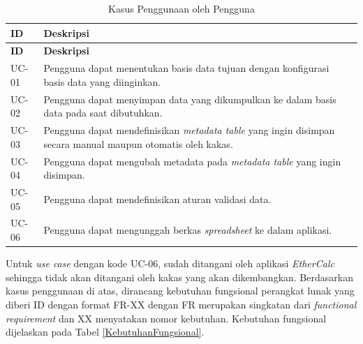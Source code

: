 \begin{small}
	\begin{longtable}{ | p{2cm} | p{10cm} | }
		\caption{Kasus Penggunaan oleh Pengguna}
		\label{KebutuhanPengguna}                                                                                                                     \\ \hline
		\centering\bfseries{ID} & \centering\bfseries{Deskripsi} \tabularnewline \hline
		\endfirsthead
		\hline
		\centering\bfseries{ID} & \centering\bfseries{Deskripsi} \tabularnewline \hline
		\endhead
		UC-01                   & Pengguna dapat menentukan basis data tujuan dengan konfigurasi basis data yang diinginkan.                          \\ \hline
		UC-02                   & Pengguna dapat menyimpan data yang dikumpulkan ke dalam basis data pada saat dibutuhkan.                            \\ \hline
		UC-03                   & Pengguna dapat mendefinisikan \textit{metadata table} yang ingin disimpan secara manual maupun otomatis oleh kakas. \\ \hline
		UC-04                   & Pengguna dapat mengubah metadata pada \textit{metadata table} yang ingin disimpan.                                  \\ \hline
		UC-05                   & Pengguna dapat mendefinisikan aturan validasi data.                                                                 \\ \hline
		UC-06                   & Pengguna dapat mengunggah berkas \textit{spreadsheet} ke dalam aplikasi.                                            \\ \hline
	\end{longtable}
\end{small}

Untuk \textit{use case} dengan kode UC-06, sudah ditangani oleh aplikasi \textit{EtherCalc} sehingga tidak akan ditangani oleh kakas yang akan dikembangkan. Berdasarkan kasus penggunaan di atas, dirancang kebutuhan fungsional perangkat lunak yang diberi ID dengan format FR-XX dengan FR merupakan singkatan dari \textit{functional requirement} dan XX menyatakan nomor kebutuhan. Kebutuhan fungsional dijelaskan pada Tabel \ref{KebutuhanFungsional}.

